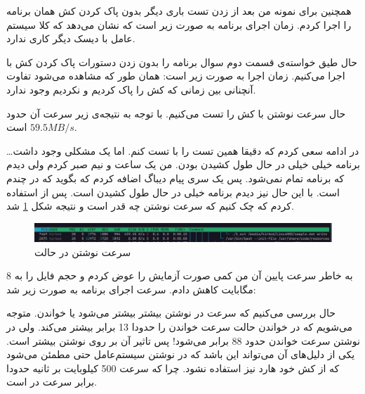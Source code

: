 همچنین برای نمونه من بعد از زدن تست
باری دیگر بدون پاک کردن کش همان برنامه را اجرا کردم. زمان اجرای برنامه به صورت زیر است که نشان می‌دهد که
کلا سیستم عامل با دیسک دیگر کاری ندارد.

حال طیق خواسته‌ی قسمت دوم سوال برنامه را بدون زدن دستورات پاک کردن کش با
اجرا می‌کنیم. زمان اجرا به صورت زیر است:
همان طور که مشاهده می‌شود تفاوت آنچنانی بین زمانی که کش را پاک کردیم و نکردیم وجود ندارد.

حال سرعت نوشتن با کش را تست می‌کنیم. با توجه به نتیجه‌ی زیر سرعت آن حدود
$59.5 MB/s$
است.

در ادامه سعی کردم که دقیقا همین تست را با
تست کنم. اما یک مشکلی وجود داشت\dots
برنامه خیلی خیلی در حال طول کشیدن بودن. من یک ساعت و نیم صبر کردم ولی دیدم که برنامه تمام نمی‌شود. پس یک سری
پیام دیباگ اضافه کردم که بگوید که در
چندم است. با این حال نیز دیدم برنامه خیلی در حال طول کشیدن است. پس از
استفاده کردم که چک کنیم که سرعت نوشتن چه قدر است و نتیجه شکل
\ref{fig:direct_io_write_speed}
شد.
\begin{figure}[H]
    \centering
    \includegraphics[scale=0.3]{pic/1-write-direct.png}
    \caption{سرعت نوشتن در حالت }
    \label{fig:direct_io_write_speed}
\end{figure}

به خاطر سرعت پایین آن من کمی صورت آزمایش را عوض کردم و حجم فایل را به 8 مگابایت کاهش دادم. سرعت اجرای برنامه به صورت
زیر شد:




حال بررسی می‌کنیم که سرعت در نوشتن بیشتر بیشتر می‌شود یا خواندن. متوجه می‌شویم که در خواندن حالت
سرعت خواندن را حدودا 13 برابر بیشتر می‌کند. ولی در نوشتن سرعت خواندن حدود 88 برابر می‌شود!
پس تاثیر آن بر روی نوشتن بیشتر است. یکی از دلیل‌های آن می‌تواند این باشد که در نوشتن سیستم‌عامل حتی مطمئن می‌شود که
از کش خود هارد نیز استفاده نشود. چرا که سرعت 500 کیلوبایت بر ثانیه حدودا برابر سرعت
در
است.